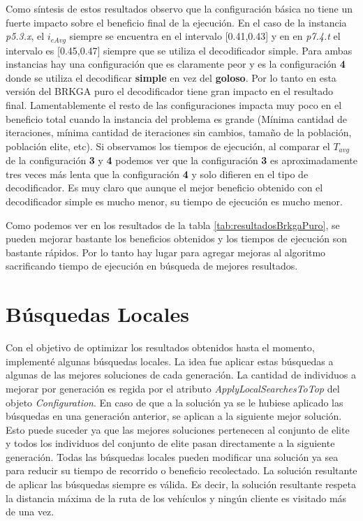\bigskip

Como síntesis de estos resultados observo que la configuración básica no tiene un fuerte impacto sobre el beneficio final de la ejecución. En el caso de la instancia \textit{p5.3.x}, el $i_{eAvg}$ siempre se encuentra en el intervalo [0.41,0.43] y en en \textit{p7.4.t} el intervalo es [0.45,0.47] siempre que se utiliza el decodificador simple. Para ambas instancias hay una configuración que es claramente peor y es la configuración \textbf{4} donde se utiliza el decodificar \textbf{simple} en vez del \textbf{goloso}. Por lo tanto en esta versión del BRKGA puro el decodificador tiene gran impacto en el resultado final. Lamentablemente el resto de las configuraciones impacta muy poco en el beneficio total cuando la instancia del problema es grande (Mínima cantidad de iteraciones, mínima cantidad de iteraciones sin cambios, tamaño de la población, población elite, etc). Si observamos los tiempos de ejecución, al comparar el $T_{avg}$ de la configuración \textbf{3} y \textbf{4} podemos ver que la configuración \textbf{3} es aproximadamente tres veces más lenta que la configuración \textbf{4} y solo difieren en el tipo de decodificador. Es muy claro que aunque el mejor beneficio obtenido con el decodificador simple es mucho menor, su tiempo de ejecución es mucho menor.

\bigskip

Como podemos ver en los resultados de la tabla \ref{tab:resultadosBrkgaPuro}, se pueden mejorar bastante los beneficios obtenidos y los tiempos de ejecución son bastante rápidos. Por lo tanto hay lugar para agregar mejoras al algoritmo sacrificando tiempo de ejecución en búsqueda de mejores resultados.

\bigskip

\section{Búsquedas Locales}

Con el objetivo de optimizar los resultados obtenidos hasta el momento, implementé algunas búsquedas locales. La idea fue aplicar estas búsquedas a algunas de las mejores soluciones de cada generación. La cantidad de individuos a mejorar por generación es regida por el atributo \textit{ApplyLocalSearchesToTop} del objeto \textit{Configuration}. En caso de que a la solución ya se le hubiese aplicado las búsquedas en una generación anterior, se aplican a la siguiente mejor solución. Esto puede suceder ya que las mejores soluciones pertenecen al conjunto de elite y todos los individuos del conjunto de elite pasan directamente a la siguiente generación. Todas las búsquedas locales pueden modificar una solución ya sea para reducir su tiempo de recorrido o beneficio recolectado. La solución resultante de aplicar las búsquedas siempre es válida. Es decir, la solución resultante respeta la distancia máxima de la ruta de los vehículos y ningún cliente es visitado más de una vez. 

